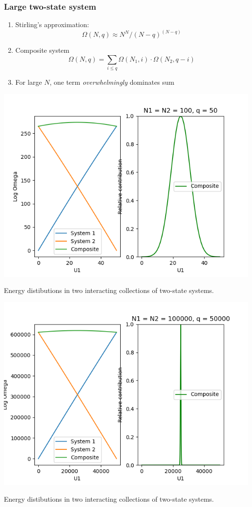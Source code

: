 \documentclass[11pt]{article}
\begin{document}
\subsubsection{Large two-state system}
\label{sec:org0c9d009}
\begin{enumerate}
\item Stirling's approximation:
\[\Omega(N,q) \approx N^N/(N-q)^{(N-q)}\]
\item Composite system
\[\Omega(N,q) = \sum_{i\le q} \Omega(N_1,i)\cdot \Omega(N_2,q-i) \]
\item For large \(N\), one term \emph{overwhelmingly} dominates sum
\end{enumerate}
\begin{center}
\includegraphics[width=.9\linewidth]{./Images/2state-100.png}
\caption{Energy distibutions in two interacting collections of two-state systems.}
\end{center}
\begin{center}
\includegraphics[width=.9\linewidth]{./Images/2state-100000.png}
\caption{Energy distibutions in two interacting collections of two-state systems.}
\end{center}
\end{document}
